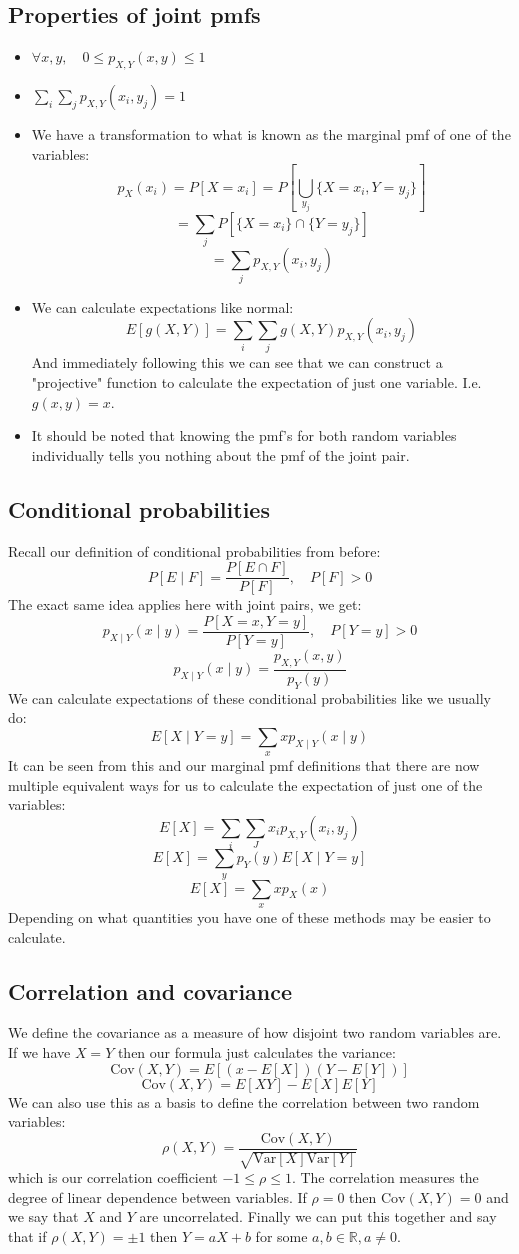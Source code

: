 \documentclass[12pt]{article}
\newcommand{\Var}[1]{\text{Var}[#1]}
\begin{document}
\subsection*{Properties of joint pmfs}
\begin{itemize}
    \item \(\forall x,y,\quad0\leq p_{X,Y}(x,y)\leq 1\)
    \item \(\sum_i\sum_jp_{X,Y}(x_i,y_j)=1\)
    \item We have a transformation to what is known as the marginal pmf of one of the variables:
    \[p_{X}(x_i)=P[X=x_i]=P\left[\bigcup_{y_j}\{X=x_i,Y=y_j\}\right]\]
    \[= \sum_jP[\{X=x_i\}\cap\{Y=y_j\}]\]
    \[=\sum_jp_{X,Y}(x_i,y_j)\]
    \item We can calculate expectations like normal:
    \[E[g(X,Y)]=\sum_i\sum_jg(X,Y)p_{X,Y}(x_i,y_j)\]
    And immediately following this we can see that we can construct a "projective" function to calculate the expectation of just one variable. I.e. \(g(x,y)=x\).
    \item It should be noted that knowing the pmf's for both random variables individually tells you nothing about the pmf of the joint pair.
\end{itemize}
\subsection*{Conditional probabilities}
Recall our definition of conditional probabilities from before:
\[P[E\mid F]=\frac{P[E\cap F]}{P[F]},\quad P[F]>0\]
The exact same idea applies here with joint pairs, we get:
\[p_{X\mid Y}(x\mid y)=\frac{P[X=x, Y=y]}{P[Y=y]},\quad P[Y=y]>0\]
\[p_{X\mid Y}(x\mid y)=\frac{p_{X,Y}(x,y)}{p_Y(y)}\]
We can calculate expectations of these conditional probabilities like we usually do:
\[E[X\mid Y=y]=\sum_xxp_{X\mid Y}(x\mid y)\]
It can be seen from this and our marginal pmf definitions that there are now multiple equivalent ways for us to calculate the expectation of just one of the variables:
\[E[X]=\sum_i\sum_Jx_ip_{X,Y}(x_i,y_j)\]
\[E[X]=\sum_yp_Y(y)E[X\mid Y=y]\]
\[E[X]=\sum_xxp_X(x)\]
Depending on what quantities you have one of these methods may be easier to calculate.
\subsection*{Correlation and covariance}
We define the covariance as a measure of how disjoint two random variables are. If we have \(X=Y\) then our formula just calculates the variance:
\[\text{Cov}(X,Y)=E\left[(x-E[X])(Y-E[Y])\right]\]
\[\text{Cov}(X,Y)=E[XY]-E[X]E[Y]\]
We can also use this as a basis to define the correlation between two random variables:
\[\rho(X,Y)=\frac{\text{Cov}(X,Y)}{\sqrt{\Var{X}\Var{Y}}}\]
which is our correlation coefficient \(-1\leq\rho\leq1\). The correlation measures the degree of linear dependence between variables. If \(\rho=0\) then \(\text{Cov}(X,Y)=0\) and we say that \(X\) and \(Y\) are uncorrelated. Finally we can put this together and say that if \(\rho(X,Y)=\pm1\) then \(Y=aX+b\) for some \(a,b\in\mathbb{R}, a\ne 0\).
\end{document}
